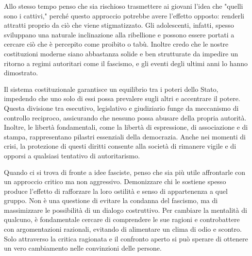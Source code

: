 \documentclass[12pt]{book} %
\begin{document}
\begin{mdframed}[linewidth=1pt]
Allo stesso tempo penso che sia rischioso trasmettere ai giovani l'idea che "quelli sono i cattivi," perché questo approccio potrebbe avere l’effetto opposto: renderli attratti proprio da ciò che viene stigmatizzato. Gli adolescenti, infatti, spesso sviluppano una naturale inclinazione alla ribellione e possono essere portati a cercare ciò che è percepito come proibito o tabù. Inoltre credo che le nostre costituzioni moderne siano abbastanza solide e ben strutturate da impedire un ritorno a regimi autoritari come il fascismo, e gli eventi degli ultimi anni lo hanno dimostrato.

Il sistema costituzionale garantisce un equilibrio tra i poteri dello Stato, impedendo che uno solo di essi possa prevalere sugli altri e accentrare il potere. Questa divisione tra esecutivo, legislativo e giudiziario funge da meccanismo di controllo reciproco, assicurando che nessuno possa abusare della propria autorità. Inoltre, le libertà fondamentali, come la libertà di espressione, di associazione e di stampa, rappresentano pilastri essenziali della democrazia. Anche nei momenti di crisi, la protezione di questi diritti consente alla società di rimanere vigile e di opporsi a qualsiasi tentativo di autoritarismo.

Quando ci si trova di fronte a idee fasciste, penso che sia più utile affrontarle con un approccio critico ma non aggressivo. Demonizzare chi le sostiene spesso produce l'effetto di rafforzare la loro ostilità e senso di appartenenza a quel gruppo. Non è una questione di evitare la condanna del fascismo, ma di massimizzare le possibilità di un dialogo costruttivo. Per cambiare la mentalità di qualcuno, è fondamentale cercare di comprendere le sue ragioni e controbattere con argomentazioni razionali, evitando di alimentare un clima di odio e scontro. Solo attraverso la critica ragionata e il confronto aperto si può sperare di ottenere un vero cambiamento nelle convinzioni delle persone.
\end{mdframed}
\end{document}
